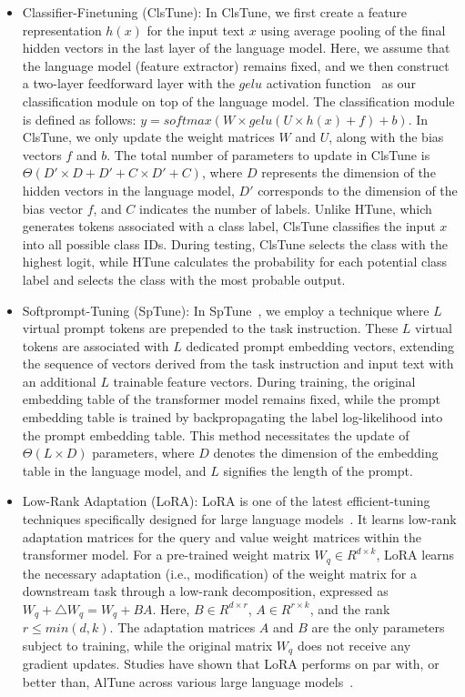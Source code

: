 \documentclass[11pt]{article}
\begin{document}
\begin{itemize}
    \item Classifier-Finetuning (ClsTune): In ClsTune, we first create a feature representation $h(x)$ for the input text $x$ using average pooling of the final hidden vectors in the last layer of the language model. Here, we assume that the language model (feature extractor) remains fixed, and we then construct a two-layer feedforward layer with the $gelu$ activation function~\cite{DBLP:journals/corr/HendrycksG16} as our classification module on top of the language model. The classification module is defined as follows: $y = softmax(W \times gelu(U \times h(x) + f) + b)$. In ClsTune, we only update the weight matrices $W$ and $U$, along with the bias vectors $f$ and $b$. The total number of parameters to update in ClsTune is $\Theta(D' \times D + D' + C \times D' + C)$, where $D$ represents the dimension of the hidden vectors in the language model, $D'$ corresponds to the dimension of the bias vector $f$, and $C$ indicates the number of labels. Unlike HTune, which generates tokens associated with a class label, ClsTune classifies the input $x$ into all possible class IDs. During testing, ClsTune selects the class with the highest logit, while HTune calculates the probability for each potential class label and selects the class with the most probable output.

    \item Softprompt-Tuning (SpTune): In SpTune~\cite{lester-etal-2021-power}, we employ a technique where $L$ virtual prompt tokens are prepended to the task instruction. These $L$ virtual tokens are associated with $L$ dedicated prompt embedding vectors, extending the sequence of vectors derived from the task instruction and input text with an additional $L$ trainable feature vectors. During training, the original embedding table of the transformer model remains fixed, while the prompt embedding table is trained by backpropagating the label log-likelihood into the prompt embedding table. This method necessitates the update of $\Theta(L \times D)$ parameters, where $D$ denotes the dimension of the embedding table in the language model, and $L$ signifies the length of the prompt. 
    
    \item Low-Rank Adaptation (LoRA): LoRA is one of the latest efficient-tuning techniques specifically designed for large language models~\cite{DBLP:journals/corr/abs-2106-09685}. It learns low-rank adaptation matrices for the query and value weight matrices within the transformer model. For a pre-trained weight matrix $W_q \in R^{d \times k}$, LoRA learns the necessary adaptation (i.e., modification) of the weight matrix for a downstream task through a low-rank decomposition, expressed as $W_q + \triangle W_q = W_q + BA$. Here, $B \in R^{d \times r}$, $A \in R^{r \times k}$, and the rank $r \le min(d, k)$. The adaptation matrices $A$ and $B$ are the only parameters subject to training, while the original matrix $W_q$ does not receive any gradient updates. Studies have shown that LoRA performs on par with, or better than, AlTune across various large language models~\cite{DBLP:journals/corr/abs-2106-09685}.
    
\end{itemize}
\end{document}
